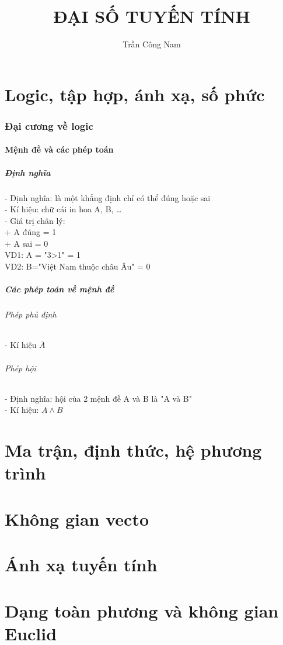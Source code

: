 \documentclass{article}
\title{ĐẠI SỐ TUYẾN TÍNH}
\author{Trần Công Nam}
\begin{document}
\maketitle

\part[short]{Logic, tập hợp, ánh xạ, số phức}

\section[short]{Đại cương về logic}

\subsection{Mệnh đề và các phép toán}
\subsubsection {Định nghĩa}
\begin{tabbing}
- Định nghĩa: là một khẳng định chỉ có thể đúng hoặc sai\\
- Kí hiệu: chữ cái in hoa A, B, \dots \\
- \= Giá trị chân lý: \\
\> + A đúng = 1 \\
\> + A sai = 0  \\
VD1: A = "3>1" = 1 \\
VD2: B="Việt Nam thuộc châu Âu" = 0 \\
\end{tabbing}

\subsubsection {Các phép toán về mệnh đề}

\paragraph{Phép phủ định}
- Kí hiệu $\overline{A}$\\

\paragraph{Phép hội}
- Định nghĩa: hội của 2 mệnh đề A và B là "A và B"\\
- Kí hiệu: $A \wedge B$\\ 




\part{Ma trận, định thức, hệ phương trình}

\part{Không gian vecto}

\part{Ánh xạ tuyến tính}

\part{Dạng toàn phương và không gian Euclid}
\end{document}
